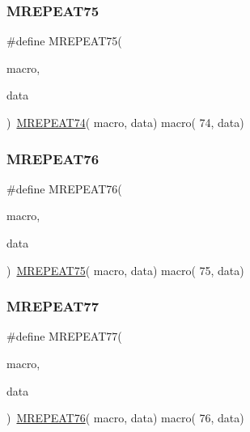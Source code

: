 \mbox{\label{group__group__sam0__utils__mrepeat_ga0b35f78c7db7ec7d73d5af309eb1c59c}} 
\subsubsection{\texorpdfstring{MREPEAT75}{MREPEAT75}}
{\footnotesize\ttfamily \#define M\+R\+E\+P\+E\+A\+T75(\begin{DoxyParamCaption}\item[{}]{macro,  }\item[{}]{data }\end{DoxyParamCaption})~\mbox{\hyperlink{group__group__sam0__utils__mrepeat_ga87d76594b00b293cc7221f7de33e1a41}{M\+R\+E\+P\+E\+A\+T74}}( macro, data)   macro( 74, data)}

\mbox{\label{group__group__sam0__utils__mrepeat_ga58c5f129a638f3cad65063a67dbdcbb6}} 
\subsubsection{\texorpdfstring{MREPEAT76}{MREPEAT76}}
{\footnotesize\ttfamily \#define M\+R\+E\+P\+E\+A\+T76(\begin{DoxyParamCaption}\item[{}]{macro,  }\item[{}]{data }\end{DoxyParamCaption})~\mbox{\hyperlink{group__group__sam0__utils__mrepeat_ga0b35f78c7db7ec7d73d5af309eb1c59c}{M\+R\+E\+P\+E\+A\+T75}}( macro, data)   macro( 75, data)}

\mbox{\label{group__group__sam0__utils__mrepeat_ga1831e4c1682945001b9b5fc06dedc788}} 
\subsubsection{\texorpdfstring{MREPEAT77}{MREPEAT77}}
{\footnotesize\ttfamily \#define M\+R\+E\+P\+E\+A\+T77(\begin{DoxyParamCaption}\item[{}]{macro,  }\item[{}]{data }\end{DoxyParamCaption})~\mbox{\hyperlink{group__group__sam0__utils__mrepeat_ga58c5f129a638f3cad65063a67dbdcbb6}{M\+R\+E\+P\+E\+A\+T76}}( macro, data)   macro( 76, data)}

